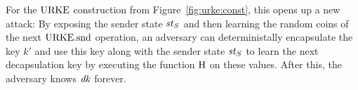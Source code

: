 For the $\mathrm{URKE}$ construction from Figure~\ref{fig:urke:const}, this opens up a new attack:
By exposing the sender state $\mathit{st}_S$ and then learning the random coins of the next $\mathrm{URKE}.\mathrm{snd}$ operation, an adversary can deterministally encapsulate the key $k'$ and use this key along with the sender state $\mathit{st}_S$ to learn the next decapsulation key by executing the function $\mathrm{H}$ on these values.
After this, the adversary knows $\mathit{dk}$ forever.
